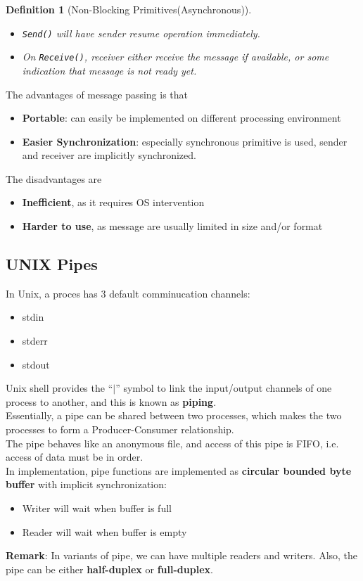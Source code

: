 \documentclass[12pt]{article}
\newtheorem{definition}{Definition}[section]
\theoremstyle{definition}
\begin{document}
\begin{definition}[Non-Blocking Primitives(Asynchronous)]
\hfill\\\normalfont 
\begin{itemize}
  \item \texttt{Send()} will have sender resume operation immediately.
  \item On \texttt{Receive()}, receiver either receive the message if available, or some indication that message is not ready yet.
\end{itemize}
\end{definition} 
The advantages of message passing is that
\begin{itemize}
  \item \textbf{Portable}: can easily be implemented on different processing environment
  \item \textbf{Easier Synchronization}: especially synchronous primitive is used, sender and receiver are implicitly synchronized.
\end{itemize}
The disadvantages are 
\begin{itemize}
  \item \textbf{Inefficient}, as it requires OS intervention
  \item \textbf{Harder to use}, as message are usually limited in size and/or format
\end{itemize}
\subsection{UNIX Pipes}
In Unix, a proces has 3 default comminucation channels:
\begin{itemize}
  \item stdin
  \item stderr
  \item stdout
\end{itemize}
Unix shell provides the ``$\mid$'' symbol to link the input/output channels of one process to another, and this is known as \textbf{piping}.\\
Essentially, a pipe can be shared between two processes, which makes the two processes to form a Producer-Consumer relationship.\\
The pipe behaves like an anonymous file, and access of this pipe is FIFO, i.e. access of data must be in order.\\

In implementation, pipe functions are implemented as \textbf{circular bounded byte buffer} with implicit synchronization:
\begin{itemize}
\item Writer will wait when buffer is full
\item Reader will wait when buffer is empty
\end{itemize} 
\textbf{Remark}: In variants of pipe, we can have multiple readers and writers. Also, the pipe can be either \textbf{half-duplex} or \textbf{full-duplex}.\\
\end{document}
